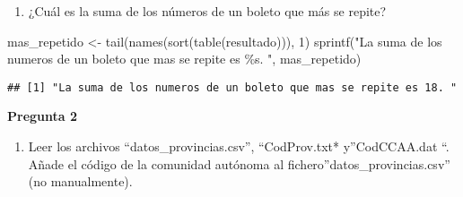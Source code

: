 \documentclass[
  12pt,
]{article}
\newenvironment{Shaded}{\begin{snugshade}}{\end{snugshade}}
\newcommand{\DecValTok}[1]{\textcolor[rgb]{0.00,0.00,0.81}{#1}}
\newcommand{\FunctionTok}[1]{\textcolor[rgb]{0.00,0.00,0.00}{#1}}
\newcommand{\NormalTok}[1]{#1}
\newcommand{\OtherTok}[1]{\textcolor[rgb]{0.56,0.35,0.01}{#1}}
\newcommand{\StringTok}[1]{\textcolor[rgb]{0.31,0.60,0.02}{#1}}
\providecommand{\tightlist}{%
  \setlength{\itemsep}{0pt}\setlength{\parskip}{0pt}}
\begin{document}
\begin{enumerate}
\def\labelenumi{\alph{enumi})}
\setcounter{enumi}{1}
\tightlist
\item
  ¿Cuál es la suma de los números de un boleto que más se repite?
\end{enumerate}

\begin{Shaded}
\begin{Highlighting}[]
\NormalTok{mas\_repetido }\OtherTok{\textless{}{-}} \FunctionTok{tail}\NormalTok{(}\FunctionTok{names}\NormalTok{(}\FunctionTok{sort}\NormalTok{(}\FunctionTok{table}\NormalTok{(resultado))), }\DecValTok{1}\NormalTok{)}
\FunctionTok{sprintf}\NormalTok{(}\StringTok{"La suma de los numeros de un boleto que mas se repite es \%s. "}\NormalTok{, }
\NormalTok{        mas\_repetido)}
\end{Highlighting}
\end{Shaded}

\begin{verbatim}
## [1] "La suma de los numeros de un boleto que mas se repite es 18. "
\end{verbatim}

\textbf{Pregunta 2}

\begin{enumerate}
\def\labelenumi{\alph{enumi})}
\tightlist
\item
  Leer los archivos ``datos\_provincias.csv'', ``CodProv.txt*
  y''CodCCAA.dat ``. Añade el código de la comunidad autónoma al
  fichero''datos\_provincias.csv'' (no manualmente).
\end{enumerate}
\end{document}
